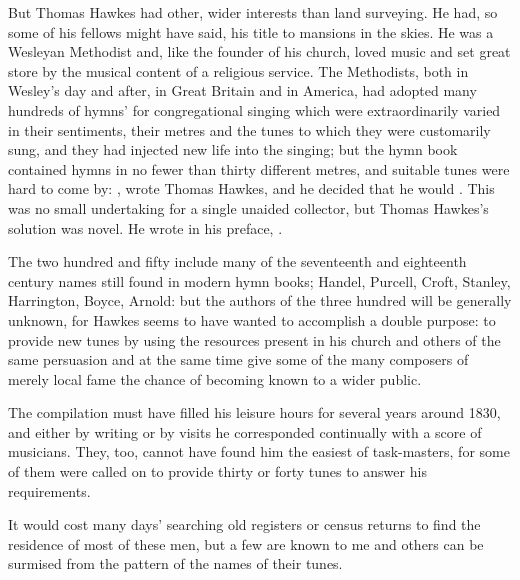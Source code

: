 But Thomas Hawkes had other, wider interests than land surveying. He had, so some of his fellows might have said, his title to mansions in the skies. He was a Wesleyan Methodist and, like the founder of his church, loved music and set great store by the musical content of a religious service. The Methodists, both in Wesley's day and after, in Great Britain and in America, had adopted many hundreds of hymns' for congregational singing which were extraordinarily varied in their sentiments, their metres and the tunes to which they were customarily sung, and they had injected new life into the singing; but the hymn book contained hymns in no fewer than thirty different metres, and suitable tunes were hard to come by: , wrote Thomas Hawkes, and he decided that he would . This was no small undertaking for a single unaided collector, but Thomas Hawkes's solution was novel. He wrote in his preface, .

The two hundred and fifty include many of the seventeenth and eighteenth century names still found in modern hymn books; Handel, Purcell, Croft, Stanley, Harrington, Boyce, Arnold: but the authors of the three hundred will be generally unknown, for Hawkes seems to have wanted to accomplish a double purpose: to provide new tunes by using the resources present in his church and others of the same persuasion and at the same time give some of the many composers of merely local fame the chance of becoming known to a wider public.
 
The compilation must have filled his leisure hours for several years around 1830, and either by writing or by visits he corresponded continually with a score of musicians. They, too, cannot have found him the easiest of task-masters, for some of them were called on to provide thirty or forty tunes to answer his requirements.

It would cost many days' searching old registers or census returns to find the residence of most of these men, but a few are known to me and others can be surmised from the pattern of the names of their tunes.

